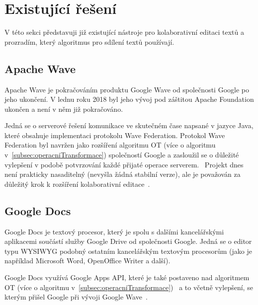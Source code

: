 
\section{Existující řešení}\label{sec:existujícíŘešení}
V této sekci představuji již existující nástroje pro kolaborativní editaci textů a prozradím, který algoritmus pro sdílení textů používají.

\subsection{Apache Wave}\label{subsec:apacheWave}
Apache Wave je pokračováním produktu Google Wave od společnosti Google po jeho ukončení.
V lednu roku 2018 byl jeho vývoj pod záštitou Apache Foundation ukončen a není v něm již pokračováno.~\cite{wave:apache}

Jedná se o serverové řešení komunikace ve skutečném čase napsané v jazyce Java, které obsahuje implementaci protokolu Wave Federation.
Protokol Wave Federation byl navržen jako rozšíření algoritmu \gls{OT} (více o algoritmu v~\ref{subsec:operacniTransformace}) společností Google a zasloužil se o důležité vylepšení v podobě potvrzování každé přijaté operace serverem.~\cite{wave:apache, wave:google}
Projekt dnes není prakticky nasaditelný (nevyšla žádná stabilní verze), ale je považován za důležitý krok k rozšíření kolaborativní editace~\cite{ot:codecommit}.

\subsection{Google Docs}\label{subsec:googleDocs}
Google Docs je textový procesor, který je spolu s dalšími kancelářskými aplikacemi součástí služby Google Drive od společnosti Google.
Jedná se o editor typu \gls{WYSIWYG} podobný ostatním kancelářským textovým procesorům (jako je například Microsoft Word, OpenOffice Writer a další).~\cite{docs:top10}

Google Docs využívá Google Apps API, které je také postaveno nad algoritmem \gls{OT} (více o algoritmu v~\ref{subsec:operacniTransformace})~\cite{docs:conflict} a to včetně vylepšení, se kterým přišel Google při vývoji Google Wave~\cite{docs:appsConf}.

